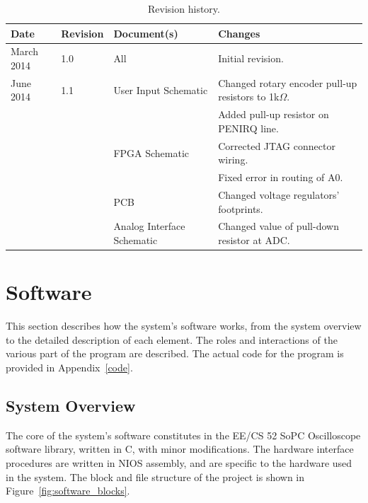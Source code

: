 \documentclass[titlepage]{scrartcl}
\begin{document}
	\begin{table}[h!]
	  \centering
    		\begin{tabular}{|p{2cm} | p{1.5cm} | p{2.5cm} | p{8cm} |}
		 \hline
		 \textbf{Date} & \textbf{Revision} & \textbf{Document(s)} & \textbf{Changes}\\
		 \hline
		 March 2014 & 1.0 & All & Initial revision. \\ \hline
		 June 2014 & 1.1 & User Input Schematic & Changed rotary encoder pull-up resistors to 1k$\Omega$.\\ \cline{4-4}
		                   &       &                                    & Added pull-up resistor on PENIRQ line.\\ \cline{3-4}
		                   &       & FPGA Schematic        & Corrected JTAG connector wiring.\\ \cline{4-4}
		                   &       &                                    & Fixed error in routing of A0.\\ \cline{3-4}
                                     &       & PCB           		     & Changed voltage regulators' footprints.\\ \cline{3-4}
		                   &       & Analog Interface Schematic        & Changed value of pull-down resistor at ADC.\\
		\hline
		\end{tabular}
              \caption{Revision history.}
	     \label{tab:rev_history}
	\end{table}

	\clearpage


	\section{Software}
	This section describes how the system's software works, from the system overview to the detailed description of each element. The roles and interactions of the various part of the program are described. The actual code for the program is provided in Appendix~\ref{code}.
	
	\subsection{System Overview \label{sec:sw_overview}}
	The core of the system's software constitutes in the EE/CS 52 SoPC Oscilloscope software library, written in C, with minor modifications. The hardware interface procedures are written in NIOS assembly, and are specific to the hardware used in the system. The block and file structure of the project is shown in Figure~\ref{fig:software_blocks}. \\
\end{document}

